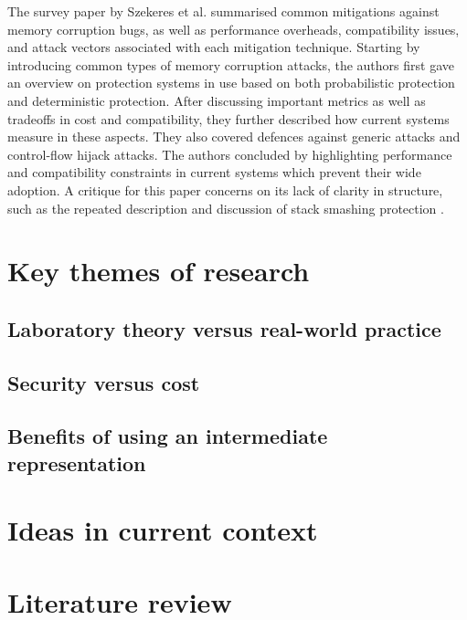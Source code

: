 \documentclass[11pt]{article}
\begin{document}
The survey paper by Szekeres et al. \cite{szekeres2013sok} summarised common mitigations against memory corruption bugs, as well as performance overheads, compatibility issues, and attack vectors associated with each mitigation technique. Starting by introducing common types of memory corruption attacks, the authors first gave an overview on protection systems in use based on both probabilistic protection and deterministic protection. After discussing important metrics as well as tradeoffs in cost and compatibility, they further described how current systems measure in these aspects. They also covered defences against generic attacks and control-flow hijack attacks. The authors concluded by highlighting performance and compatibility constraints in current systems which prevent their wide adoption. A critique for this paper concerns on its lack of clarity in structure, such as the repeated description and discussion of stack smashing protection \cite[III, VIII-B]{szekeres2013sok}.



\section{Key themes of research}

\subsection{Laboratory theory versus real-world practice}

\subsection{Security versus cost}

\subsection{Benefits of using an intermediate representation}

\section{Ideas in current context}

\section{Literature review}



\footnotesize{}
\end{document}
